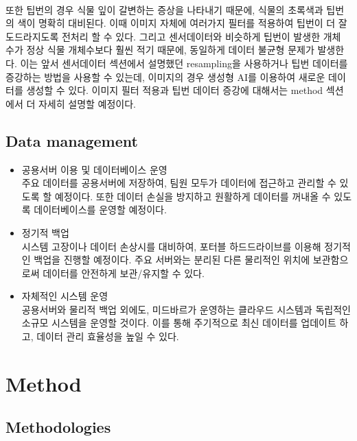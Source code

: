 \documentclass[11pt]{article}
\begin{document}
    \paragraph{} 또한 팁번의 경우 식물 잎이 갈변하는 증상을 나타내기 때문에, 식물의 초록색과 팁번의 색이 명확히 대비된다. 이때 이미지 자체에 여러가지 필터를 적용하여 팁번이 더 잘 도드라지도록 전처리 할 수 있다. 그리고 센서데이터와 비슷하게 팁번이 발생한 개체 수가 정상 식물 개체수보다 훨씬 적기 때문에, 동일하게 데이터 불균형 문제가 발생한다. 이는 앞서 센서데이터 섹션에서 설명했던 resampling을 사용하거나 팁번 데이터를 증강하는 방법을 사용할 수 있는데, 이미지의 경우 생성형 AI를 이용하여 새로운 데이터를 생성할 수 있다. 이미지 필터 적용과 팁번 데이터 증강에 대해서는 method 섹션에서 더 자세히 설명할 예정이다. 


    \subsection{Data management}
    \begin{itemize}
    \item {공용서버 이용 및 데이터베이스 운영} \\
    주요 데이터를 공용서버에 저장하여, 팀원 모두가 데이터에 접근하고 관리할 수 있도록 할 예정이다. 또한 데이터 손실을 방지하고 원활하게 데이터를 꺼내올 수 있도록 데이터베이스를 운영할 예정이다.

    \item {정기적 백업} \\
    시스템 고장이나 데이터 손상시를 대비하여, 포터블 하드드라이브를 이용해 정기적인 백업을 진행할 예정이다. 주요 서버와는 분리된 다른 물리적인 위치에 보관함으로써 데이터를 안전하게 보관/유지할 수 있다.

    \item {자체적인 시스템 운영} \\
    공용서버와 물리적 백업 외에도, 미드바르가 운영하는 클라우드 시스템과 독립적인 소규모 시스템을 운영할 것이다. 이를 통해 주기적으로 최신 데이터를 업데이트 하고, 데이터 관리 효율성을 높일 수 있다.
    \end{itemize}

    \section{Method}                       
    \subsection{Methodologies}                       
\end{document}
